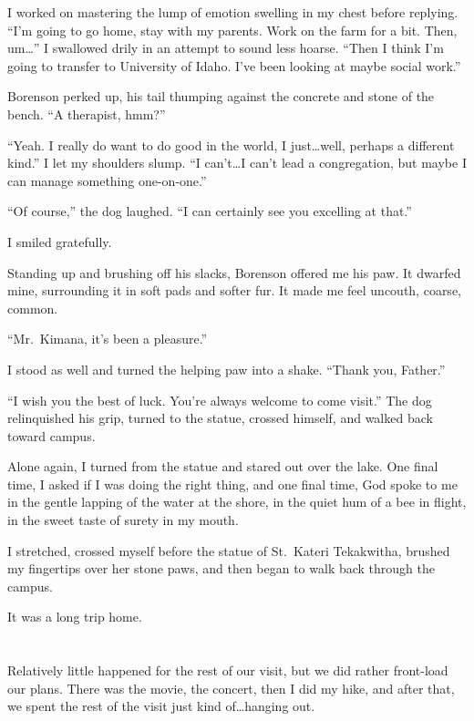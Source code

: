 I worked on mastering the lump of emotion swelling in my chest before replying. ``I'm going to go home, stay with my parents. Work on the farm for a bit. Then, um\ldots{}'' I swallowed drily in an attempt to sound less hoarse. ``Then I think I'm going to transfer to University of Idaho. I've been looking at maybe social work.''

Borenson perked up, his tail thumping against the concrete and stone of the bench. ``A therapist, hmm?''

``Yeah. I really do want to do good in the world, I just\ldots well, perhaps a different kind.'' I let my shoulders slump. ``I can't\ldots I can't lead a congregation, but maybe I can manage something one-on-one.''

``Of course,'' the dog laughed. ``I can certainly see you excelling at that.''

I smiled gratefully.

Standing up and brushing off his slacks, Borenson offered me his paw. It dwarfed mine, surrounding it in soft pads and softer fur. It made me feel uncouth, coarse, common.

``Mr.~Kimana, it's been a pleasure.''

I stood as well and turned the helping paw into a shake. ``Thank you, Father.''

``I wish you the best of luck. You're always welcome to come visit.'' The dog relinquished his grip, turned to the statue, crossed himself, and walked back toward campus.

Alone again, I turned from the statue and stared out over the lake. One final time, I asked if I was doing the right thing, and one final time, God spoke to me in the gentle lapping of the water at the shore, in the quiet hum of a bee in flight, in the sweet taste of surety in my mouth.

I stretched, crossed myself before the statue of St.~Kateri Tekakwitha, brushed my fingertips over her stone paws, and then began to walk back through the campus.

It was a long trip home.

\section{}

Relatively little happened for the rest of our visit, but we did rather front-load our plans. There was the movie, the concert, then I did my hike, and after that, we spent the rest of the visit just kind of\ldots hanging out.


